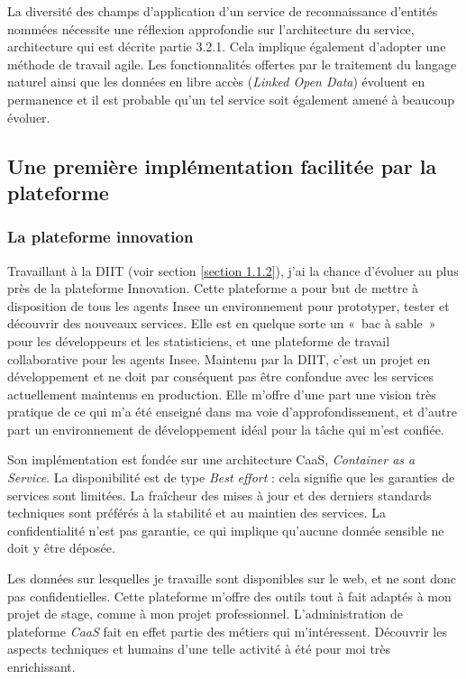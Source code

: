 La diversité des champs d'application d'un service de reconnaissance d'entités nommées nécessite une réflexion approfondie sur l'architecture du service, architecture qui est décrite partie 3.2.1. Cela implique également d'adopter une méthode de travail agile. Les fonctionnalités offertes par le traitement du langage naturel ainsi que les données en libre accès (\textit{Linked Open Data}) évoluent en permanence et il est probable qu'un tel service soit également amené à beaucoup évoluer.
\label{section 2.1.4}

\subsection{Une première implémentation facilitée par la plateforme}

\subsubsection{La plateforme innovation}
Travaillant à la DIIT (voir section \ref{section 1.1.2}), j'ai la chance d'évoluer au plus près de la plateforme Innovation. Cette plateforme a pour but de mettre à disposition de tous les agents Insee un environnement pour prototyper, tester et découvrir des nouveaux services. Elle est en quelque sorte un «~bac à sable~» pour les développeurs et les statisticiens, et une plateforme de travail collaborative pour les agents Insee. Maintenu par la DIIT, c'est un projet en développement et ne doit par conséquent pas être confondue avec les services actuellement maintenus en production. Elle m'offre d'une part une vision très pratique de ce qui m'a été enseigné dans ma voie d'approfondissement, et d'autre part un environnement de développement idéal pour la tâche qui m'est confiée.
\newline

Son implémentation est fondée sur une architecture CaaS, \textit{Container as a Service}. La disponibilité est de type \textit{Best effort} : cela signifie que les garanties de services sont limitées. La fraîcheur des mises à jour et des derniers standards techniques sont préférés à la stabilité et au maintien des services. La confidentialité n'est pas garantie, ce qui implique qu'aucune donnée sensible ne doit y être déposée.
\newline

Les données sur lesquelles je travaille sont disponibles sur le web, et ne sont donc pas confidentielles. Cette plateforme m'offre des outils tout à fait adaptés à mon projet de stage, comme à mon projet professionnel. L'administration de plateforme \textit{CaaS} fait en effet partie des métiers qui m'intéressent. Découvrir les aspects techniques et humains d'une telle activité à été pour moi très enrichissant.
\label{section 2.2.1}

